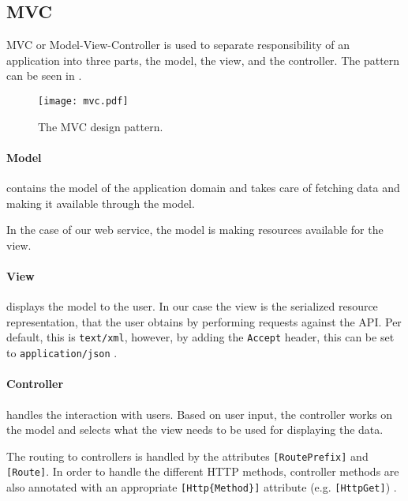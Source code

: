 \subsection{MVC} 
MVC or Model-View-Controller\cite{aspmvc} is used to separate responsibility of an application into three parts, the model, the view, and the controller.
The pattern can be seen in .

\begin{figure}[h]
\begin{center}
\texttt{[image: mvc.pdf]}
\caption{The MVC design pattern.}
\label{mvcdiagram}
\end{center}
\end{figure}

\paragraph{Model} contains the model of the application domain and takes care of fetching data and making it available through the model.

In the case of our web service, the model is making resources available for the view.

\paragraph{View} displays the model to the user.
In our case the view is the serialized resource representation, that the user obtains by performing requests against the API.
Per default, this is \texttt{text/xml}, however, by adding the \texttt{Accept} header, this can be set to \texttt{application/json} \cite[Section 14]{http_specification}.

\paragraph{Controller} handles the interaction with users.
Based on user input, the controller works on the model and selects what the view needs to be used for displaying the data.

The routing to controllers is handled by the attributes \texttt{[RoutePrefix]} and \texttt{[Route]}.
In order to handle the different HTTP methods, controller methods are also annotated with an appropriate \texttt{[Http\{Method\}]} attribute (e.g. \texttt{[HttpGet]}) \cite{asp_routing}.